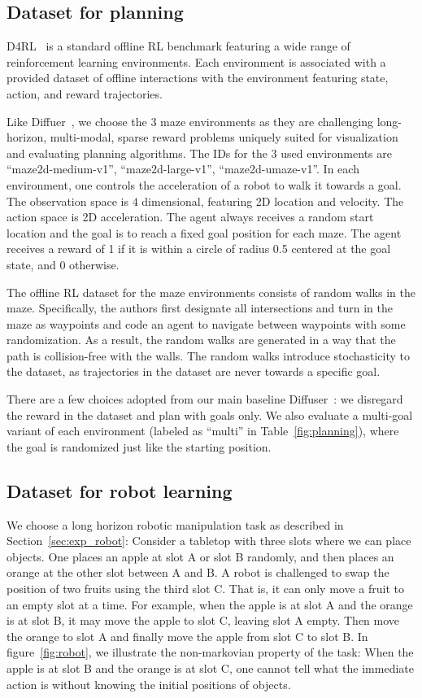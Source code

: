 \subsection{Dataset for planning}
\label{app:dataset_planning}
D4RL~\cite{d4rl} is a standard offline RL benchmark featuring a wide range of reinforcement learning environments. Each environment is associated with a provided dataset of offline interactions with the environment featuring state, action, and reward trajectories. 

Like Diffuer~\cite{janner2022planning}, we choose the 3 maze environments as they are challenging long-horizon, multi-modal, sparse reward problems uniquely suited for visualization and evaluating planning algorithms. The IDs for the 3 used environments are ``maze2d-medium-v1'', ``maze2d-large-v1'', ``maze2d-umaze-v1''. In each environment, one controls the acceleration of a robot to walk it towards a goal. The observation space is $4$ dimensional, featuring 2D location and velocity. The action space is 2D acceleration. The agent always receives a random start location and the goal is to reach a fixed goal position for each maze. The agent receives a reward of 1 if it is within a circle of radius 0.5 centered at the goal state, and 0 otherwise. 

The offline RL dataset for the maze environments consists of random walks in the maze. Specifically, the authors first designate all intersections and turn in the maze as waypoints and code an agent to navigate between waypoints with some randomization. As a result, the random walks are generated in a way that the path is collision-free with the walls. The random walks introduce stochasticity to the dataset, as trajectories in the dataset are never towards a specific goal. 

There are a few choices adopted from our main baseline Diffuser~\cite{janner2022planning}: we disregard the reward in the dataset and plan with goals only. We also evaluate a multi-goal variant of each environment (labeled as ``multi'' in Table~\ref{fig:planning}), where the goal is randomized just like the starting position. 

\subsection{Dataset for robot learning}
We choose a long horizon robotic manipulation task as described in Section~\ref{sec:exp_robot}: Consider a tabletop with three slots where we can place objects. One places an apple at slot A or slot B randomly, and then places an orange at the other slot between A and B. A robot is challenged to swap the position of two fruits using the third slot C. That is, it can only move a fruit to an empty slot at a time. For example, when the apple is at slot A and the orange is at slot B, it may move the apple to slot C, leaving slot A empty. Then move the orange to slot A and finally move the apple from slot C to slot B. In figure~\ref{fig:robot}, we illustrate the non-markovian property of the task: When the apple is at slot B and the orange is at slot C, one cannot tell what the immediate action is without knowing the initial positions of objects.

